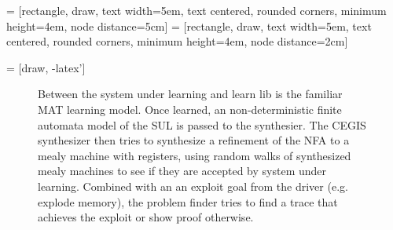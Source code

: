 

 = [rectangle, draw,
    text width=5em, text centered, rounded corners, 
    minimum height=4em, node distance=5cm]
 = [rectangle, draw,
    text width=5em, text centered, rounded corners, 
    minimum height=4em, node distance=2cm]

 = [draw, -latex']


\begin{figure}
    \centering
    \caption{
    Between the system under learning and learn lib is the familiar MAT learning model.
    Once learned, an non-deterministic finite automata model of the SUL is passed to the synthesier.
    The CEGIS synthesizer then tries to synthesize a refinement of the NFA to a mealy machine with registers, using random walks of synthesized mealy machines to see if they are accepted by system under learning.
    Combined with an an exploit goal from the driver (e.g. explode memory), the problem finder tries to find a trace that achieves the exploit or show proof otherwise.
    }
\end{figure}